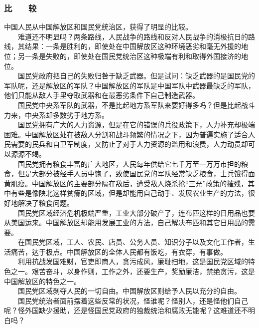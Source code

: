 \documentclass[cn,11pt,chinese]{elegantbook}
\def\myformat#1{\hfil\hfil #1}
\begin{document}
\subsubsection*{\myformat{比　　较}}
中国人民从中国解放区和国民党统治区，获得了明显的比较。\\
　　难道还不明显吗？两条路线，人民战争的路线和反对人民战争的消极抗日的路线，其结果：一条是胜利的，即使处在中国解放区这种环境恶劣和毫无外援的地位；另一条是失败的，即使处在国民党统治区这种极端有利和取得外国接济的地位。\\
　　国民党政府把自己的失败归咎于缺乏武器。但是试问：缺乏武器的是国民党的军队呢，还是解放区的军队？中国解放区的军队是中国军队中武器最缺乏的军队，他们只能从敌人手里夺取武器和在最恶劣条件下自己制造武器。\\
　　国民党中央系军队的武器，不是比起地方系军队来要好得多吗？但是比起战斗力来，中央系却多数劣于地方系。\\
　　国民党拥有广大的人力资源，但是在它的错误的兵役政策下，人力补充却极端困难。中国解放区处在被敌人分割和战斗频繁的情况之下，因为普遍实施了适合人民需要的民兵和自卫军制度，又防止了对于人力资源的滥用和浪费，人力动员却可以源源不竭。\\
　　国民党拥有粮食丰富的广大地区，人民每年供给它七千万至一万万市担的粮食，但是大部分被经手人员中饱了，致使国民党的军队经常缺乏粮食，士兵饿得面黄肌瘦。中国解放区的主要部分隔在敌后，遭受敌人烧杀抢“三光”政策的摧残，其中有些是像陕北这样贫瘠的区域，但是却能用自己动手、发展农业生产的方法，很好地解决了粮食问题。\\
　　国民党区域经济危机极端严重，工业大部分破产了，连布匹这样的日用品也要从美国运来。中国解放区却能用发展工业的方法，自己解决布匹和其它日用品的需要。\\
　　在国民党区域，工人、农民、店员、公务人员、知识分子以及文化工作者，生活痛苦，达于极点。中国解放区的全体人民都有饭吃，有衣穿，有事做。\\
　　利用抗战发国难财，官吏即商人，贪污成风，廉耻扫地，这是国民党区域的特色之一。艰苦奋斗，以身作则，工作之外，还要生产，奖励廉洁，禁绝贪污，这是中国解放区的特色之一。\\
　　国民党区域剥夺人民的一切自由。中国解放区则给予人民以充分的自由。\\
　　国民党统治者面前摆着这些反常的状况，怪谁呢？怪别人，还是怪他们自己呢？怪外国缺少援助，还是怪国民党政府的独裁统治和腐败无能呢？这难道还不明白吗？\\
\end{document}
